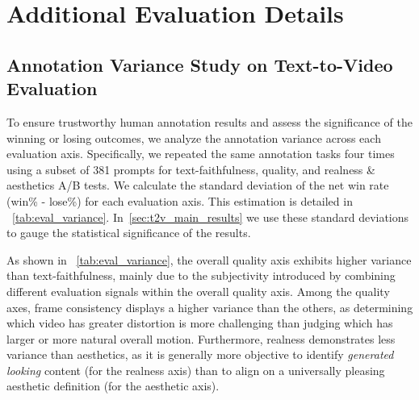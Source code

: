 \section{Additional Evaluation Details}









\subsection{Annotation Variance Study on Text-to-Video Evaluation} \label{appendix_sec:variance}
To ensure trustworthy human annotation results and assess the significance of the winning or losing outcomes, we analyze the annotation variance across each evaluation axis.
Specifically, we repeated the same annotation tasks four times using a subset of 381 prompts for text-faithfulness, quality, and realness \& aesthetics A/B tests.
We calculate the standard deviation of the net win rate (win\% - lose\%) for each evaluation axis.
This estimation is detailed in ~\cref{tab:eval_variance}.
In~\cref{sec:t2v_main_results} we use these standard deviations to gauge the statistical significance of the results.

As shown in ~\cref{tab:eval_variance}, the overall quality axis exhibits higher variance than text-faithfulness, mainly due to the subjectivity introduced by combining different evaluation signals within the overall quality axis.
Among the quality axes, frame consistency displays a higher variance than the others, as determining which video has greater distortion is more challenging than judging which has larger or more natural overall motion.
Furthermore, realness demonstrates less variance than aesthetics, as it is generally more objective to identify \textit{generated looking} content (for the realness axis) than to align on a universally pleasing aesthetic definition (for the aesthetic axis).

  \begin{table}[h]
      \centering
      \caption{\textbf{Evaluation Variance.}
        Each number is acquired by sending the same A/B testing four times and compute standard deviation on the net win rate of each evaluation metric.
      }
      \label{tab:eval_variance}
  \end{table}

